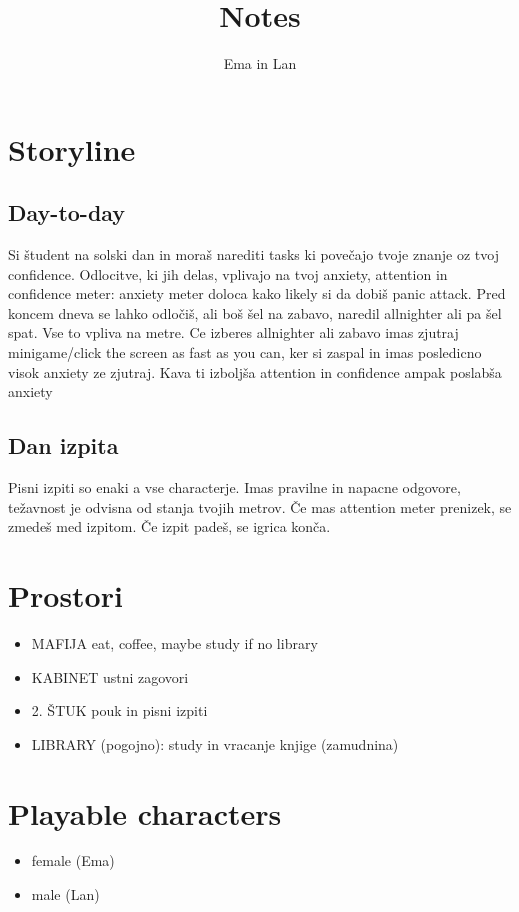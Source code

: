 \documentclass[a4paper]{article}
\begin{document}
\title{Notes}
\author{Ema in Lan}
\date{}
\maketitle

\section{Storyline}
\subsection*{Day-to-day}
Si študent na solski dan in moraš narediti tasks ki povečajo tvoje znanje oz tvoj confidence.
Odlocitve, ki jih delas, vplivajo na tvoj anxiety, attention in confidence meter: anxiety meter doloca kako likely si da dobiš panic attack. Pred koncem dneva se lahko odločiš, ali boš šel na zabavo, naredil allnighter ali pa šel spat. Vse to vpliva na metre. Ce izberes allnighter ali zabavo imas zjutraj minigame/click the screen as fast as you can, ker si zaspal in imas posledicno visok anxiety ze zjutraj. Kava ti izboljša attention in confidence ampak poslabša anxiety

\subsection*{Dan izpita}
Pisni izpiti so enaki a vse characterje. Imas pravilne in napacne odgovore, težavnost je odvisna od stanja tvojih metrov.
Če mas attention meter prenizek, se zmedeš med izpitom.
Če izpit padeš, se igrica konča.

\section{Prostori}
\begin{itemize}
    \item MAFIJA\: eat, coffee, maybe study if no library
    \item KABINET\: ustni zagovori
    \item 2. ŠTUK\: pouk in pisni izpiti
    \item LIBRARY (pogojno): study in vracanje knjige (zamudnina)
\end{itemize}

\section{Playable characters}
\begin{itemize}
    \item female (Ema)
    \item male (Lan)
\end{itemize}
\end{document}
